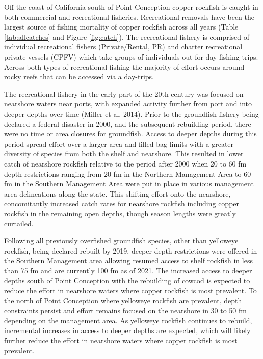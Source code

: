 \documentclass[11pt,
  english,
  letterpaper,
]{article}
\begin{document}
Off the coast of California south of Point Conception copper rockfish is caught in both commercial and recreational fisheries. Recreational removals have been the largest source of fishing mortality of copper rockfish across all years (Table \ref{tab:allcatches} and Figure \ref{fig:catch}). The recreational fishery is comprised of individual recreational fishers (Private/Rental, PR) and charter recreational private vessels (CPFV) which take groups of individuals out for day fishing trips. Across both types of recreational fishing the majority of effort occurs around rocky reefs that can be accessed via a day-trips.

The recreational fishery in the early part of the 20th century was focused on nearshore waters near ports, with expanded activity further from port and into deeper depths over time (Miller et al. 2014). Prior to the groundfish fishery being declared a federal disaster in 2000, and the subsequent rebuilding period, there were no time or area closures for groundfish. Access to deeper depths during this period spread effort over a larger area and filled bag limits with a greater diversity of species from both the shelf and nearshore. This resulted in lower catch of nearshore rockfish relative to the period after 2000 when 20 to 60 fm depth restrictions ranging from 20 fm in the Northern Management Area to 60 fm in the Southern Management Area were put in place in various management area delineations along the state. This shifting effort onto the nearshore, concomitantly increased catch rates for nearshore rockfish including copper rockfish in the remaining open depths, though season lengths were greatly curtailed.

Following all previously overfished groundfish species, other than yelloweye rockfish, being declared rebuilt by 2019, deeper depth restrictions were offered in the Southern Management area allowing resumed access to shelf rockfish in less than 75 fm and are currently 100 fm as of 2021. The increased access to deeper depths south of Point Conception with the rebuilding of cowcod is expected to reduce the effort in nearshore waters where copper rockfish is most prevalent. To the north of Point Conception where yelloweye rockfish are prevalent, depth constraints persist and effort remains focused on the nearshore in 30 to 50 fm depending on the management area. As yelloweye rockfish continues to rebuild, incremental increases in access to deeper depths are expected, which will likely further reduce the effort in nearshore waters where copper rockfish is most prevalent.
\end{document}
